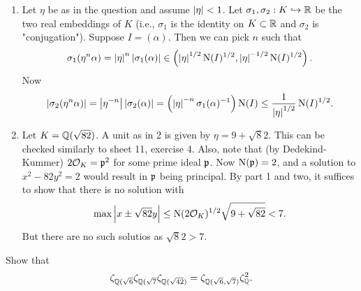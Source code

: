 \documentclass[a4paper,11pt]{article}
\begin{document}
\begin{enumerate}[wide, labelindent=0pt]
    \item Let $\eta$ be as in the question and assume $\left\lvert \eta \right\rvert < 1$. Let
        $\sigma_1, \sigma_2: K \hookrightarrow \mathbb{R}$ be the two real embeddings of $K$ (i.e., 
        $\sigma_1$ is the identity on $K \subset \mathbb{R}$ and $\sigma_2$ is "conjugation").
        Suppose $I = (\alpha)$. Then we can pick $n$ such that 
        \begin{equation*}
            \sigma_1(\eta^n \alpha) = \left\lvert \eta \right\rvert^n \left\lvert \sigma_1(\alpha) \right\rvert
            \in \left(\left\lvert \eta \right\rvert^{1/2} \operatorname{N}(I)^{1/2}, \left\lvert \eta \right\rvert^{-1/2}
            \operatorname{N}(I)^{1/2}\right).
        \end{equation*}
        Now 
        \begin{equation*}
            \left\lvert \sigma_2(\eta^n \alpha) \right\rvert = \left\lvert \eta^{-n} \right\rvert \left\lvert \sigma_2(\alpha) \right\rvert
            = \left( \left\lvert \eta \right\rvert^{-n} \sigma_1(\alpha)^{-1} \right) \operatorname{N}(I)
                \leq \frac 1{\left\lvert \eta \right\rvert^{1/2}} \operatorname{N}(I)^{1/2}.
        \end{equation*}

    \item Let $K = \mathbb{Q}(\sqrt {82})$. A unit as in 2 is given by $\eta = 9 + \sqrt 82$. 
        This can be checked similarly to sheet 11, exercise 4. 
        Also, note that (by Dedekind-Kummer) $2 \mathcal{O}_K= \mathfrak{p}^2$ for some prime
        ideal $\mathfrak{p}$. Now $\operatorname{N}(\mathfrak{p})=2$, and a solution to $x^2 - 82y^2 = 2$
        would result in $\mathfrak{p}$ being principal. 
        By part 1 and two, it suffices to show that there is no solution with
        $$\max \left\lvert x \pm \sqrt {82} y \right\rvert \leq \operatorname{N}(2 \mathcal{O}_K)^{1/2} \sqrt{9 + \sqrt{82}}
        < 7.$$
        But there are no such solutios as $\sqrt 82 > 7$. 
\end{enumerate}


Show that 
\begin{equation*}
    \zeta_{\mathbb{Q}(\sqrt 6} \zeta_{\mathbb{Q}(\sqrt 7} \zeta_{\mathbb{Q}(\sqrt {42})} 
    = \zeta_{\mathbb{Q}(\sqrt 6, \sqrt 7)} \zeta_{\mathbb{Q}}^2.
\end{equation*}
\end{document}
